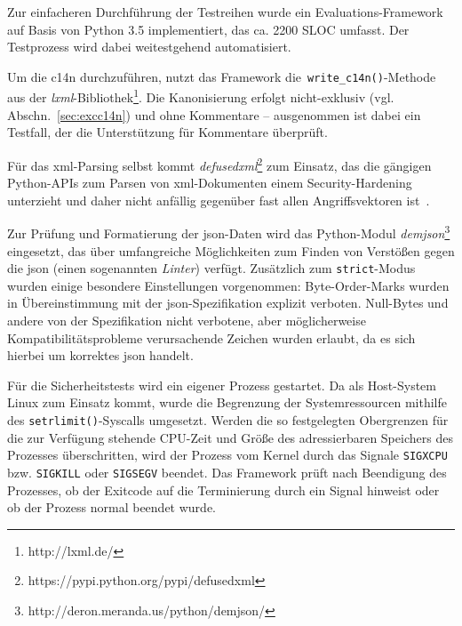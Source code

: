 
Zur einfacheren Durchführung der Testreihen wurde ein Evaluations-Framework auf Basis von Python 3.5 implementiert, das ca. 2200 SLOC umfasst. Der Testprozess wird dabei weitestgehend automatisiert.

Um die \acrlong{c14n} durchzuführen, nutzt das Framework die~\texttt{write_c14n()}-Methode aus der \emph{lxml}-Bibliothek\footnote{http://lxml.de/}. Die Kanonisierung erfolgt nicht-exklusiv (vgl. Abschn.~\ref{sec:excc14n}) und ohne Kommentare -- ausgenommen ist dabei ein Testfall, der die Unterstützung für Kommentare überprüft.

Für das \acrshort{xml}-Parsing selbst kommt \emph{defusedxml}\footnote{https://pypi.python.org/pypi/defusedxml} zum Einsatz, das die gängigen Python-APIs zum Parsen von \acrshort{xml}-Dokumenten einem Security-Hardening unterzieht und daher nicht anfällig gegenüber fast allen Angriffsvektoren ist~\cite[Abschn. 9.5]{spaeth2016sok}.

Zur Prüfung und Formatierung der \acrshort{json}-Daten wird das Python-Modul \emph{demjson}\footnote{http://deron.meranda.us/python/demjson/} eingesetzt, das über umfangreiche Möglichkeiten zum Finden von Verstößen gegen die \acrshort{json} (einen sogenannten \emph{Linter}) verfügt. Zusätzlich zum \texttt{strict}-Modus wurden einige besondere Einstellungen vorgenommen: Byte-Order-Marks wurden in Übereinstimmung mit der \acrshort{json}-Spezifikation explizit verboten. Null-Bytes und andere von der Spezifikation nicht verbotene, aber möglicherweise Kompatibilitätsprobleme verursachende Zeichen wurden erlaubt, da es sich hierbei um korrektes \acrshort{json} handelt.

Für die Sicherheitstests wird ein eigener Prozess gestartet. Da als Host-System Linux zum Einsatz kommt, wurde die Begrenzung der Systemressourcen mithilfe des \texttt{setrlimit()}-Syscalls umgesetzt. Werden die so festgelegten Obergrenzen für die zur Verfügung stehende CPU-Zeit und Größe des adressierbaren Speichers des Prozesses überschritten, wird der Prozess vom Kernel durch das Signale \texttt{SIGXCPU} bzw. \texttt{SIGKILL} oder \texttt{SIGSEGV} beendet. Das Framework prüft nach Beendigung des Prozesses, ob der Exitcode auf die Terminierung durch ein Signal hinweist oder ob der Prozess normal beendet wurde.
